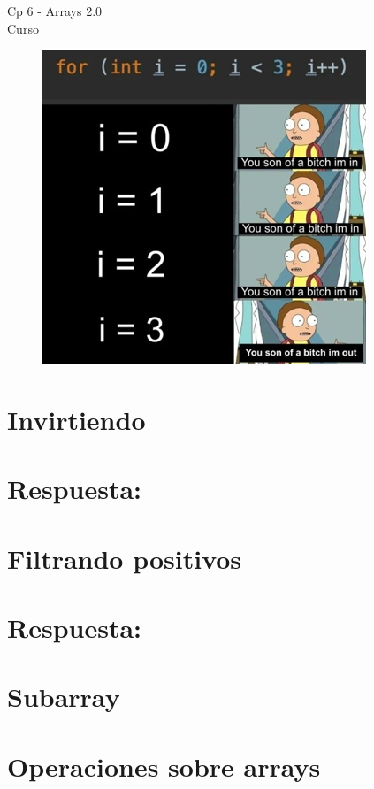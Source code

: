 \begin{center}
    \begin{large}
    Cp 6 - Arrays 2.0\\
    Curso \academicyear\\
    \end{large}
    \begin{figure}[h]
    	\centering
    	\includegraphics[width=0.5\linewidth]{cp4/loops.jpg}
    \end{figure}
\end{center}

\section{Invirtiendo}

\ifshowanswers
\section*{Respuesta:}

\fi

\section{Filtrando positivos}

\ifshowanswers
\section*{Respuesta:}

\fi

\section{Subarray}


\section{Operaciones sobre arrays}

\ifshowanswers
